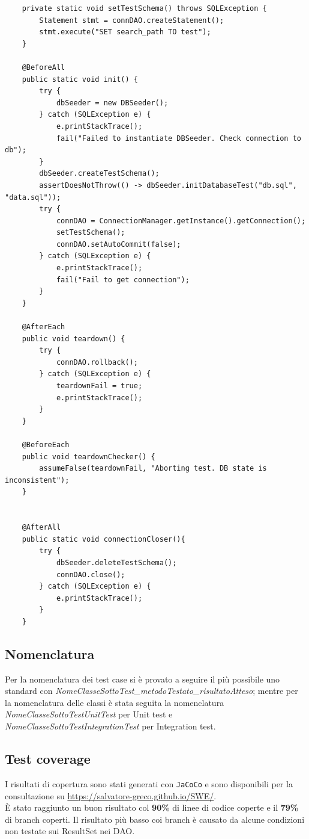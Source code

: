 \begin{code}
    \begin{verbatim}
    private static void setTestSchema() throws SQLException {
        Statement stmt = connDAO.createStatement();
        stmt.execute("SET search_path TO test");
    }

    @BeforeAll
    public static void init() {
        try {
            dbSeeder = new DBSeeder();
        } catch (SQLException e) {
            e.printStackTrace();
            fail("Failed to instantiate DBSeeder. Check connection to db");
        }
        dbSeeder.createTestSchema();
        assertDoesNotThrow(() -> dbSeeder.initDatabaseTest("db.sql", "data.sql"));
        try {
            connDAO = ConnectionManager.getInstance().getConnection();
            setTestSchema();
            connDAO.setAutoCommit(false);
        } catch (SQLException e) {
            e.printStackTrace();
            fail("Fail to get connection");
        }
    }

    @AfterEach
    public void teardown() {
        try {
            connDAO.rollback();
        } catch (SQLException e) {
            teardownFail = true;
            e.printStackTrace();
        }
    }

    @BeforeEach
    public void teardownChecker() {
        assumeFalse(teardownFail, "Aborting test. DB state is inconsistent");
    }


    @AfterAll
    public static void connectionCloser(){
        try {
            dbSeeder.deleteTestSchema();
            connDAO.close();
        } catch (SQLException e) {
            e.printStackTrace();
        }
    }        
    \end{verbatim}
    \caption{metodi della classe BaseIntegrationTest}
\end{code}
\subsection{Nomenclatura}\label{subsec:nomenclatura}
Per la nomenclatura dei test case si è provato a seguire il più possibile uno standard con \textit{NomeClasseSottoTest\_metodoTestato\_risultatoAtteso}; mentre per la nomenclatura delle classi è stata seguita la nomenclatura \textit{NomeClasseSottoTestUnitTest} per Unit test e \textit{NomeClasseSottoTestIntegrationTest} per Integration test.
\subsection{Test coverage}
I risultati di copertura sono stati generati con \texttt{JaCoCo} e sono disponibili per la consultazione su \url{https://salvatore-greco.github.io/SWE/}.\\
È stato raggiunto un buon risultato col \textbf{90\%} di linee di codice coperte e il \textbf{79\%} di branch coperti. Il risultato più basso coi branch è causato da alcune condizioni non testate sui ResultSet nei DAO.
